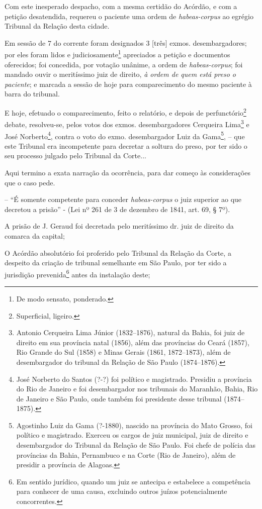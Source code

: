Com este inesperado despacho, com a mesma certidão do Acórdão, e com a
petição desatendida, requereu o paciente uma ordem de
\emph{habeas-corpus} ao egrégio Tribunal da Relação desta cidade.

Em sessão de 7 do corrente foram designados 3 {[}três{]} exmos.
desembargadores; por eles foram lidos e judiciosamente\footnote{ De
  modo sensato, ponderado.} apreciados a petição e documentos
oferecidos; foi concedida, por votação unânime, a ordem de
\emph{habeas-corpus}; foi mandado ouvir o meritíssimo juiz de direito,
\emph{à ordem de quem está preso o paciente}; e marcada a sessão de hoje
para comparecimento do mesmo paciente à barra do tribunal.

E hoje, efetuado o comparecimento, feito o relatório, e depois de
perfunctório\footnote{ Superficial, ligeiro.} debate, resolveu-se,
pelos votos dos exmos. desembargadores Cerqueira Lima\footnote{ Antonio
  Cerqueira Lima Júnior (1832--1876), natural da Bahia, foi juiz de
  direito em sua província natal (1856), além das províncias do Ceará
  (1857), Rio Grande do Sul (1858) e Minas Gerais (1861, 1872--1873),
  além de desembargador do tribunal da Relação de São Paulo (1874--1876).}
e José Norberto\footnote{ José Norberto do Santos (?-?) foi político e
  magistrado. Presidiu a província do Rio de Janeiro e foi desembargador
  nos tribunais do Maranhão, Bahia, Rio de Janeiro e São Paulo, onde
  também foi presidente desse tribunal (1874--1875).}, contra o voto do
exmo. desembargador Luiz da Gama\footnote{ Agostinho Luiz da Gama
  (?-1880), nascido na província do Mato Grosso, foi político e
  magistrado. Exerceu os cargos de juiz municipal, juiz de direito e
  desembargador do Tribunal da Relação de São Paulo. Foi chefe de
  polícia das províncias da Bahia, Pernambuco e na Corte (Rio de
  Janeiro), além de presidir a província de Alagoas.}, -- que este
Tribunal era incompetente para decretar a soltura do preso, por ter sido
o seu processo julgado pelo Tribunal da Corte...

Aqui termino a exata narração da ocorrência, para dar começo às
considerações que o caso pede.

-- ``É somente competente para conceder \emph{habeas-corpus} o juiz
superior ao que decretou a prisão'' - (Lei nº 261 de 3 de dezembro de
1841, art. 69, § 7º).

A prisão de J. Geraud foi decretada pelo meritíssimo dr. juiz de direito
da comarca da capital;

O Acórdão absolutório foi proferido pelo Tribunal da Relação da Corte, a
despeito da criação de tribunal semelhante em São Paulo, por ter sido a
jurisdição prevenida\footnote{ Em sentido jurídico, quando um juiz se
  antecipa e estabelece a competência para conhecer de uma causa,
  excluindo outros juízos potencialmente concorrentes.} antes da
instalação deste;

